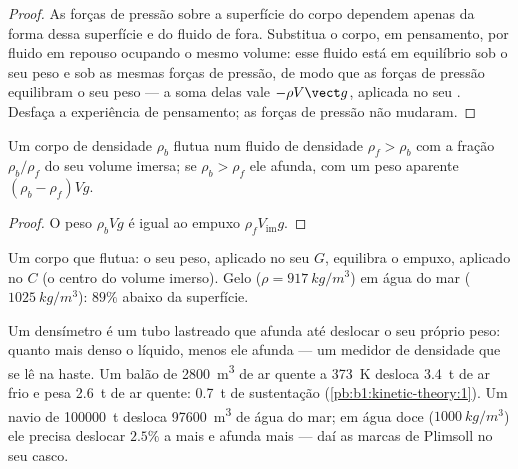\begin{proof}
As forças de pressão sobre a superfície do corpo dependem apenas da forma
dessa superfície e do fluido de fora. Substitua o corpo, em pensamento, por
fluido em repouso ocupando o mesmo volume: esse fluido está em equilíbrio
sob o seu peso e sob as mesmas forças de pressão, de modo que as forças de
pressão equilibram o seu peso --- a soma delas vale $-\rho V\vect g$, aplicada no
seu . Desfaça a experiência de pensamento; as forças de
pressão não mudaram.
\end{proof}

\begin{corollary}[Flutuação]\label{cor:b1:fluid-statics:floating}
Um corpo de densidade $\rho_b$ flutua num fluido de densidade $\rho_f > \rho_b$
com a fração $\rho_b/\rho_f$ do seu volume imersa; se $\rho_b >
\rho_f$ ele afunda, com um peso aparente $(\rho_b - \rho_f)Vg$.
\end{corollary}

\begin{proof}
O peso $\rho_bVg$ é igual ao empuxo $\rho_fV_{\text{im}}g$.
\end{proof}

\begin{omfigure}

{\small Um corpo que flutua: o seu peso, aplicado no seu  $G$,
equilibra o empuxo, aplicado no  $C$ (o centro do volume
imerso). Gelo ($\rho = \qty{917}{kg/m^3}$) em água do
mar ($\qty{1025}{kg/m^3}$): $89\%$ abaixo da superfície.}
\end{omfigure}

\begin{example}\label{ex:b1:fluid-statics:buoy}
Um densímetro é um tubo lastreado que afunda até deslocar o seu próprio
peso: quanto mais denso o líquido, menos ele afunda --- um medidor de densidade
que se lê na haste. Um balão de \qty{2800}{m^3} de ar quente a \qty{373}{K} desloca
\qty{3.4}{t} de ar frio e pesa \qty{2.6}{t} de ar quente: \qty{0.7}{t}
de sustentação (\cref{pb:b1:kinetic-theory:1}). Um navio de \qty{100000}{t}
desloca \qty{97600}{m^3} de água do mar; em água doce ($\qty{1000}{kg/m^3}$)
ele precisa deslocar $2.5\%$ a mais e afunda mais --- daí as marcas de Plimsoll
no seu casco.
\end{example}

